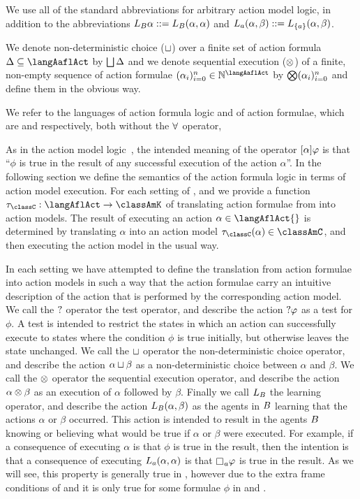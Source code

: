 We use all of the standard abbreviations for arbitrary action model logic, in addition to the abbreviations $\learnsBs \alpha ::= \learnsBs (\alpha, \alpha)$ and $\learnsA (\alpha, \beta) ::= \learns[{\{\agentA\}}] (\alpha, \beta)$.

We denote non-deterministic choice ($\choice$) over a finite set of action formula $\Delta \subseteq \langAaflAct$ by $\bigchoice \Delta$ and we denote sequential execution ($\compose$) of a finite, non-empty sequence of action formulae $(\alpha_i)_{i=0}^{n} \in \mathbb{N}^\langAaflAct$ by $\bigcompose (\alpha_i)_{i=0}^{n}$ and define them in the obvious way.

We refer to the languages \langAfl{} of action formula logic and \langAflAct{} of action formulae, which are \langAafl{} and \langAaflAct{} respectively, both without the $\allrefs$ operator, 

As in the action model logic~\cite{baltag:2004}, the intended meaning of the operator $\actionA{\alpha} \phi$ is that ``$\phi$ is true in the result of any successful execution of the action $\alpha$''.
In the following section we define the semantics of the action formula logic in terms of action model execution.
For each setting of \classK{}, \classKFF{} and \classS{} we provide a function $\tau_\classC : \langAflAct \to \classAmK$ of translating action formulae from \langAflAct{} into action models.
The result of executing an action $\alpha \in \langAflAct{}$ is determined by translating $\alpha$ into an action model $\tau_\classC(\alpha) \in \classAmC$, and then executing the action model in the usual way.

In each setting we have attempted to define the translation from action formulae into action models in such a way that the action formulae carry an intuitive description of the action that is performed by the corresponding action model.
We call the $\test{}$ operator the test operator, and describe the action $\test{\phi}$ as a test for $\phi$.
A test is intended to restrict the states in which an action can successfully execute to states where the condition $\phi$ is true initially, but otherwise leaves the state unchanged. 
We call the $\choice$ operator the non-deterministic choice operator, and describe the action $\alpha \choice \beta$ as a non-deterministic choice between $\alpha$ and $\beta$.
We call the $\compose$ operator the sequential execution operator, and describe the action $\alpha \compose \beta$ as an execution of $\alpha$ followed by $\beta$. 
Finally we call $\learnsBs$ the learning operator, and describe the action $\learnsBs (\alpha, \beta)$ as the agents in $\agentsB$ learning that the actions $\alpha$ or $\beta$ occurred.
This action is intended to result in the agents $\agentsB$ knowing or believing what would be true if $\alpha$ or $\beta$ were executed.
For example, if a consequence of executing $\alpha$ is that $\phi$ is true in the result, then the intention is that a consequence of executing $\learnsA (\alpha, \alpha)$ is that $\knows_\agentA \phi$ is true in the result.
As we will see, this property is generally true in \logicAflK{}, however due to the extra frame conditions of \classKFF{} and \classS{} it is only true for some formulae $\phi$ in \logicAflKFF{} and \logicAflS{}.


